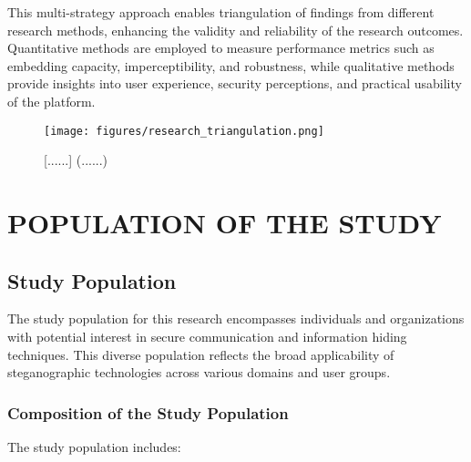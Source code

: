 \documentclass[12pt, a4paper, oneside]{book}
\begin{document}
This multi-strategy approach enables triangulation of findings from different research methods, enhancing the validity and reliability of the research outcomes. Quantitative methods are employed to measure performance metrics such as embedding capacity, imperceptibility, and robustness, while qualitative methods provide insights into user experience, security perceptions, and practical usability of the platform.

\begin{figure}[htbp]
    \centering
    \texttt{[image: figures/research\_triangulation.png]}
    \caption{[......] (......)}
    \label{fig:research_triangulation}
\end{figure}

\section{POPULATION OF THE STUDY}

\subsection{Study Population}
The study population for this research encompasses individuals and organizations with potential interest in secure communication and information hiding techniques. This diverse population reflects the broad applicability of steganographic technologies across various domains and user groups.

\subsubsection{Composition of the Study Population}
The study population includes:
\end{document}
